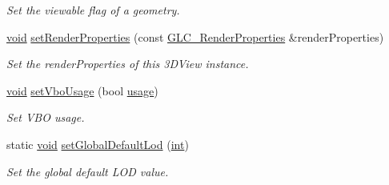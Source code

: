 \begin{DoxyCompactItemize}
\begin{DoxyCompactList}\small\item\em Set the viewable flag of a geometry. \end{DoxyCompactList}\item 
\hyperlink{group___u_a_v_objects_plugin_ga444cf2ff3f0ecbe028adce838d373f5c}{void} \hyperlink{class_g_l_c__3_d_view_instance_aff3ca140df07e0766b28bce75e451e6e}{set\-Render\-Properties} (const \hyperlink{class_g_l_c___render_properties}{G\-L\-C\-\_\-\-Render\-Properties} \&render\-Properties)
\begin{DoxyCompactList}\small\item\em Set the render\-Properties of this 3\-D\-View instance. \end{DoxyCompactList}\item 
\hyperlink{group___u_a_v_objects_plugin_ga444cf2ff3f0ecbe028adce838d373f5c}{void} \hyperlink{class_g_l_c__3_d_view_instance_a92c6ab645d9a3d35197baca758b59278}{set\-Vbo\-Usage} (bool \hyperlink{glext_8h_ae759ed0394ed5353d8bef2fb755305da}{usage})
\begin{DoxyCompactList}\small\item\em Set V\-B\-O usage. \end{DoxyCompactList}\item 
static \hyperlink{group___u_a_v_objects_plugin_ga444cf2ff3f0ecbe028adce838d373f5c}{void} \hyperlink{class_g_l_c__3_d_view_instance_aeb0397bac516744a79adfc4c8a5abf24}{set\-Global\-Default\-Lod} (\hyperlink{ioapi_8h_a787fa3cf048117ba7123753c1e74fcd6}{int})
\begin{DoxyCompactList}\small\item\em Set the global default L\-O\-D value. \end{DoxyCompactList}\end{DoxyCompactItemize}
